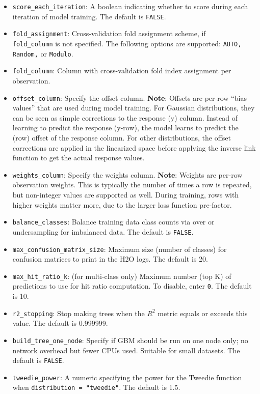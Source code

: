 \begin{itemize}
\item {\texttt{score\_each\_iteration}}: A boolean indicating whether to score during each iteration of model training.  The default is  {\texttt{FALSE}}.
\item \texttt{fold\_assignment}: Cross-validation fold assignment scheme, if  \\ \texttt{fold\_column} is not specified. The following options are supported: \texttt{AUTO, Random,} or \texttt{Modulo}. 
\item \texttt{fold\_column}:  Column with cross-validation fold index assignment per observation. 
\item \texttt{offset\_column}: Specify the offset column. {\textbf{Note}}: Offsets are per-row “bias values” that are used during model training. For Gaussian distributions, they can be seen as simple corrections to the response (y) column. Instead of learning to predict the response (y-row), the model learns to predict the (row) offset of the response column. For other distributions, the offset corrections are applied in the linearized space before applying the inverse link function to get the actual response values. 
\item \texttt{weights\_column}: Specify the weights column. {\textbf{Note}}: Weights are per-row observation weights. This is typically the number of times a row is repeated, but non-integer values are supported as well. During training, rows with higher weights matter more, due to the larger loss function pre-factor.
\item {\texttt{balance\_classes}}: Balance training data class counts via over or undersampling for imbalanced data. The default is {\texttt{FALSE}}.
\item {\texttt{max\_confusion\_matrix\_size}}: Maximum size (number of classes) for confusion matrices to print in the H2O logs.  The default is 20.
\item {\texttt{max\_hit\_ratio\_k}}: (for multi-class only) Maximum number (top K) of predictions to use for hit ratio computation.  To disable, enter  {\texttt{0}}. The default is 10.
\item {\texttt{r2\_stopping}}: Stop making trees when the $R^2$ metric equals or exceeds this value.  The default is 0.999999.
\item {\texttt{build\_tree\_one\_node}}: Specify if GBM should be run on one node only; no network overhead but fewer CPUs used. Suitable for small datasets.  The default is {\texttt{FALSE}}.
\item {\texttt{tweedie\_power}}: A numeric specifying the power for the Tweedie function when \texttt{distribution = "tweedie"}.  The default is 1.5.

\end{itemize}
